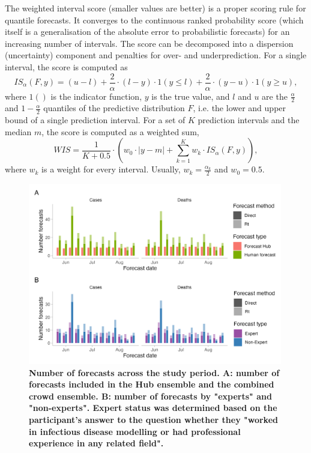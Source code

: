 \documentclass[10pt,a4paper,twocolumn]{article}
\begin{document}
The weighted interval score (smaller values are better) is a proper scoring rule for quantile forecasts. It converges to the continuous ranked probability score (which itself is a generalisation of the absolute error to probabilistic forecasts) for an increasing number of intervals. The score can be decomposed into a dispersion (uncertainty) component and penalties for over- and underprediction. For a single interval, the score is computed as 
  $$IS_\alpha(F,y) = (u-l) + \frac{2}{\alpha} \cdot (l-y) \cdot 1(y \leq l) + \frac{2}{\alpha} \cdot (y-u) \cdot 1(y \geq u), $$ 
  where $1()$ is the indicator function, $y$ is the true value, and $l$ and $u$ are the $\frac{\alpha}{2}$ and $1 - \frac{\alpha}{2}$ quantiles of the predictive distribution $F$, i.e. the lower and upper bound of a single prediction interval. For a set of $K$ prediction intervals and the median $m$, the score is computed as a weighted sum, 
  $$WIS = \frac{1}{K + 0.5} \cdot \left( w_0 \cdot |y - m| + \sum_{k = 1}^{K} w_k \cdot IS_{\alpha}(F, y) \right), $$
  where $w_k$ is a weight for every interval. Usually, $w_k = \frac{\alpha_k}{2}$ and $w_0 = 0.5$. 




\begin{figure}
\centering
\includegraphics[width=0.99\textwidth]{../output/figures/num-forecasters.png}
\caption{\bf{Number of forecasts across the study period.} A: number of forecasts included in the Hub ensemble and the combined crowd ensemble. B: number of forecasts by "experts" and "non-experts". Expert status was determined based on the participant's answer to the question whether they "worked in infectious disease modelling or had professional experience in any related field".}
\label{fig:num-forecasters}
\end{figure}
\end{document}
